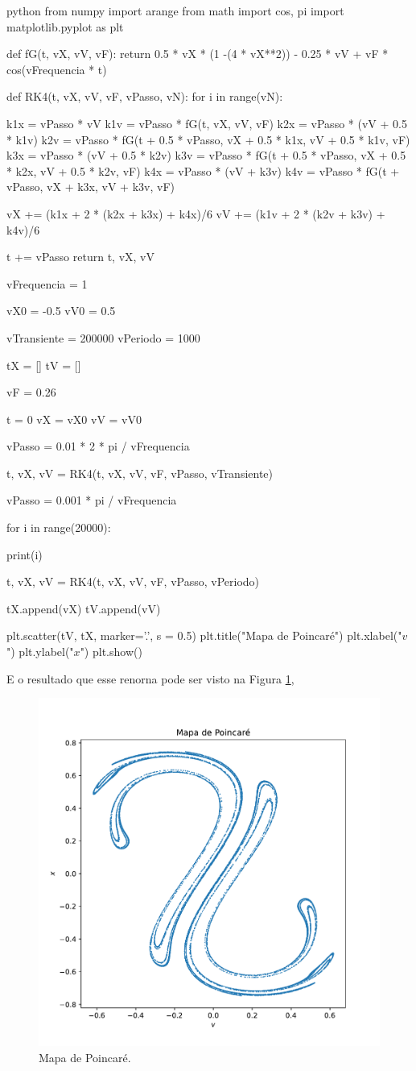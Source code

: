 \documentclass[twoside]{amsart}
\numberwithin{equation}{section}
\begin{document}
\begin{mintedbox}{python}
from numpy import arange
from math import cos, pi
import matplotlib.pyplot as plt

def fG(t, vX, vV, vF):
    return 0.5 * vX * (1 -(4 * vX**2)) - 0.25 * vV + vF * cos(vFrequencia * t)

def RK4(t, vX, vV, vF, vPasso, vN):
    for i in range(vN):

        k1x = vPasso * vV
        k1v = vPasso * fG(t, vX, vV, vF)
        k2x = vPasso * (vV + 0.5 * k1v)
        k2v = vPasso * fG(t + 0.5 * vPasso, vX + 0.5 * k1x, vV + 0.5 * k1v, vF)
        k3x = vPasso * (vV + 0.5 * k2v)
        k3v = vPasso * fG(t + 0.5 * vPasso, vX + 0.5 * k2x, vV + 0.5 * k2v, vF)
        k4x = vPasso * (vV + k3v)
        k4v = vPasso * fG(t + vPasso, vX + k3x, vV + k3v, vF)

        vX += (k1x + 2 * (k2x + k3x) + k4x)/6
        vV += (k1v + 2 * (k2v + k3v) + k4v)/6

        t += vPasso
    return t, vX, vV

vFrequencia = 1

vX0 = -0.5
vV0 = 0.5

vTransiente = 200000
vPeriodo = 1000

tX = []
tV = []

vF = 0.26

t = 0
vX = vX0
vV = vV0

vPasso = 0.01 * 2 * pi / vFrequencia

t, vX, vV = RK4(t, vX, vV, vF, vPasso, vTransiente)

vPasso = 0.001 * pi / vFrequencia

for i in range(20000):

    print(i)

    t, vX, vV = RK4(t, vX, vV, vF, vPasso, vPeriodo)

    tX.append(vX)
    tV.append(vV)

plt.scatter(tV, tX, marker='.', s = 0.5)
plt.title("Mapa de Poincaré")
plt.xlabel("$v$")
plt.ylabel("$x$")
plt.show()
\end{mintedbox}

E o resultado que esse renorna pode ser visto na Figura \ref{mp},

\begin{figure}[h]
    \includegraphics[width=0.5\linewidth]{mp.pdf}
    \caption{Mapa de Poincaré.}
    \label{mp}
\end{figure}
\end{document}
